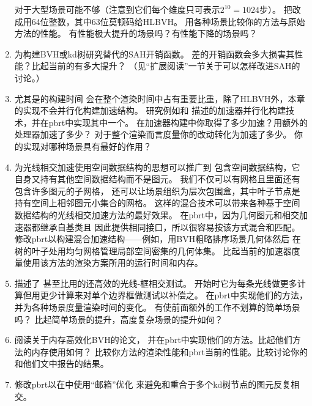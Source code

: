 \begin{enumerate}
          对于大型场景可能不够（注意到它们每个维度只可表示$2^{10}=1024$步）。
          把改成用64位整数，其中63位莫顿码给HLBVH。
          用各种场景比较你的方法与原始方法的性能。
          有性能极大提升的场景吗？有性能下降的场景吗？
    \item \circletwo 为构建BVH或kd树研究替代的SAH开销函数。
          差的开销函数会多大损害其性能？比起当前的有多大提升？
          （见“扩展阅读”一节关于可以怎样改进SAH的讨论。）
    \item \circlethree {}尤其是的构建时间
          会在整个渲染时间中占有重要比重，除了HLBVH外，本章的实现不会并行化构建加速结构。
          研究例如\citet{4342588}和\citet{10.1111/j.1467-8659.2007.01062.x}
          描述的加速器并行化构建技术，并在pbrt中实现其中一个。
          在加速器构建中你取得了多少加速？用额外的处理器加速了多少？
          对于整个渲染而言度量你的改动转化为加速了多少。
          你的实现对哪种场景具有最好的作用？
    \item \circlethree 为光线相交加速使用空间数据结构的思想可以推广到
          包含空间数据结构，它自身又持有其他空间数据结构而不是图元。
          我们不仅可以有网格且里面还有包含许多图元的子网格，
          还可以让场景组织为层次包围盒，其中叶子节点是持有空间上相邻图元小集合的网格。
          这样的混合技术可以带来各种基于空间数据结构的光线相交加速方法的最好效果。
          在pbrt中，因为几何图元和相交加速器都继承自基类且
          因此提供相同接口，所以很容易按该方式混合和匹配。
          修改pbrt以构建混合加速结构——例如，用BVH粗略排序场景几何体然后
          在树的叶子处用均匀网格管理局部空间密集的几何体集。
          比起当前的加速器度量使用该方法的渲染方案所用的运行时间和内存。
    \item \circletwo \citet{10.1080/2151237X.2007.10129248}描述了
          甚至比用的还高效的光线-框相交测试。
          开始时它为每条光线做更多计算但用更少计算来对单个边界框做测试以补偿之。
          在pbrt中实现他们的方法，并为各种场景度量渲染时间的变化。
          有使前面额外的工作不划算的简单场景吗？
          比起简单场景的提升，高度复杂场景的提升如何？
    \item \circletwo 阅读\citet{10.5555/1839214.1839242}关于内存高效化BVH的论文，
          并在pbrt中实现他们的方法。比起他们方法的内存使用如何？
          比较你方法的渲染性能和pbrt当前的性能。比较讨论你的和他们文中报告的结果。
    \item \circletwo 修改pbrt以在中使用“邮箱”优化
          来避免和重合于多个kd树节点的图元反复相交。

\end{enumerate}
